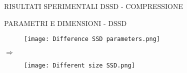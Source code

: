 \begin{subsection}{RISULTATI SPERIMENTALI DSSD - COMPRESSIONE}
    \begin{frame}{PARAMETRI E DIMENSIONI - DSSD}
        \begin{minipage}{\linewidth}
            \centering
            \begin{minipage}{0.45\linewidth}
                \begin{figure}
                    \centering
                    \texttt{[image: Difference SSD parameters.png]}
                    \centering
                \end{figure}
            \end{minipage}
            $\Rightarrow$
            \hspace{-0.5cm}
            \begin{minipage}{0.45\linewidth}
                \begin{figure}
                    \centering
                    \texttt{[image: Different size SSD.png]}
                    \centering
                \end{figure}
            \end{minipage}
        \end{minipage}
    \end{frame}
\end{subsection}

